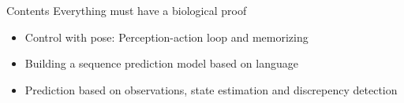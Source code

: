 \begin{frame}{Contents}
    Everything must have a biological proof
    
    
    \begin{itemize}
        \item Control with pose: Perception-action loop and memorizing
        \item Building a sequence prediction model based on language
        \item Prediction based on observations, state estimation and discrepency detection
    \end{itemize}
\end{frame}